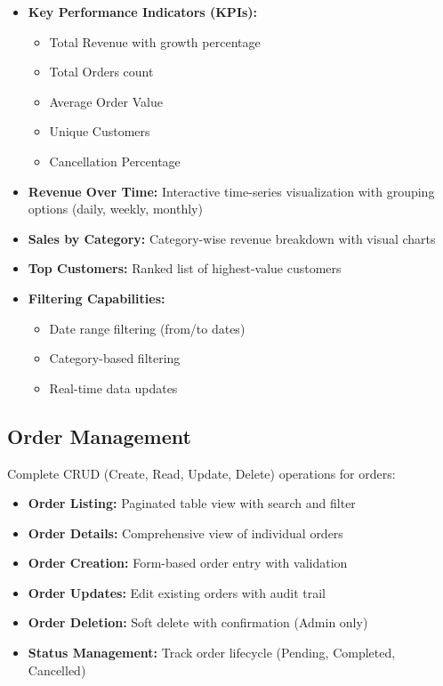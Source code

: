 \documentclass[12pt,a4paper]{article}
\begin{document}
\begin{itemize}[leftmargin=*]
    \item \textbf{Key Performance Indicators (KPIs):}
    \begin{itemize}
        \item Total Revenue with growth percentage
        \item Total Orders count
        \item Average Order Value
        \item Unique Customers
        \item Cancellation Percentage
    \end{itemize}
    
    \item \textbf{Revenue Over Time:} Interactive time-series visualization with grouping options (daily, weekly, monthly)
    
    \item \textbf{Sales by Category:} Category-wise revenue breakdown with visual charts
    
    \item \textbf{Top Customers:} Ranked list of highest-value customers
    
    \item \textbf{Filtering Capabilities:}
    \begin{itemize}
        \item Date range filtering (from/to dates)
        \item Category-based filtering
        \item Real-time data updates
    \end{itemize}
\end{itemize}

\subsection{Order Management}

Complete CRUD (Create, Read, Update, Delete) operations for orders:

\begin{itemize}[leftmargin=*]
    \item \textbf{Order Listing:} Paginated table view with search and filter
    \item \textbf{Order Details:} Comprehensive view of individual orders
    \item \textbf{Order Creation:} Form-based order entry with validation
    \item \textbf{Order Updates:} Edit existing orders with audit trail
    \item \textbf{Order Deletion:} Soft delete with confirmation (Admin only)
    \item \textbf{Status Management:} Track order lifecycle (Pending, Completed, Cancelled)
\end{itemize}
\end{document}
